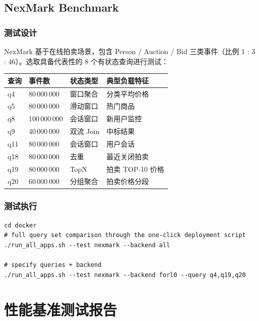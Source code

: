 \documentclass[a4paper,11pt]{article}
\begin{document}
\subsection{NexMark Benchmark}

\subsubsection{测试设计}

NexMark 基于在线拍卖场景，包含 Person / Auction / Bid 三类事件（比例 1 : 3 : 46）。选取具备代表性的 8 个有状态查询进行测试：

\begin{table}[H]
\centering
\small
\begin{tabularx}{\textwidth}{L{1.2cm} L{3.6cm} L{3.8cm} X}
\toprule
\textbf{查询} & \textbf{事件数} & \textbf{状态类型} & \textbf{典型负载特征} \\
\midrule
q4  & 80\,000\,000  & 窗口聚合            & 分类平均价格 \\
q5  & 80\,000\,000  & 滑动窗口            & 热门商品 \\
q8  & 100\,000\,000 & 会话窗口            & 新用户监控 \\
q9  & 40\,000\,000  & 双流 Join          & 中标结果 \\
q11 & 80\,000\,000  & 会话窗口            & 用户会话 \\
q18 & 80\,000\,000  & 去重                & 最近关闭拍卖 \\
q19 & 80\,000\,000  & TopN                & 拍卖 TOP-10 价格 \\
q20 & 60\,000\,000  & 分组聚合            & 拍卖价格分段 \\
\bottomrule
\end{tabularx}
\end{table}

\subsubsection{测试执行}

\begin{lstlisting}[language=shellcmd]
cd docker
# full query set comparison through the one-click deployment script
./run_all_apps.sh --test nexmark --backend all

# specify queries + backend
./run_all_apps.sh --test nexmark --backend forl0 --query q4,q19,q20
\end{lstlisting}

\section{性能基准测试报告}
\end{document}

